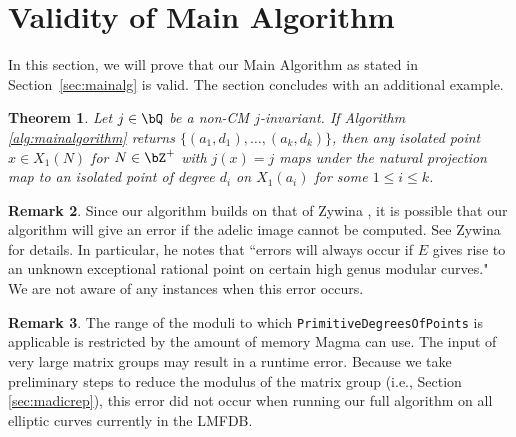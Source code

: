 \documentclass[11pt,reqno]{amsart}
\theoremstyle{plain}
\newtheorem{theorem}{Theorem}%
\theoremstyle{definition}
\newtheorem{remark}[theorem]{Remark}
\newcommand{\Q}{\bQ}
\newcommand{\Z}{\bZ}
\newcommand{\PP}{\mathbf P}
\newcommand{\filip}[1]{{\textcolor{cyan}{Filip: [#1]}}}
\begin{document}




\section{Validity of Main Algorithm}
\label{sec:validity}

In this section, we will prove that our Main Algorithm as stated in Section~\ref{sec:mainalg} is valid. The section concludes with an additional example.


\begin{theorem}\label{thm:validity_main_algorithm}
Let $j\in\Q$ be a non-CM $j$-invariant. If Algorithm \ref{alg:mainalgorithm} returns $\{( a_1,d_1), \dots, ( a_k,d_k) \}$, then any isolated point $x\in X_1(N)$ for $N \in \Z^+$ with $j(x)=j$ maps under the natural projection map to an isolated point of degree $d_i$ on $X_1(a_i)$ for some  $1 \leq i \leq k$.
\end{theorem}

\begin{remark}
Since our algorithm builds on that of Zywina \cite{ZywinaAlgorithm}, it is possible that our algorithm will give an error if the adelic image cannot be computed. See Zywina \cite{ZywinaImagesGit} for details. In particular, he notes that ``errors will always occur if $E$ gives rise to an unknown exceptional rational point on certain high genus modular curves." We are not aware of any instances when this error occurs.
\end{remark}

\begin{remark}
The range of the moduli to which \texttt{PrimitiveDegreesOfPoints} is applicable is restricted by the amount of memory Magma can use. The input of very large matrix groups may result in a runtime error. Because we take preliminary steps to reduce the modulus of the matrix group (i.e., Section \ref{sec:madicrep}), this error did not occur when running our full algorithm on all elliptic curves currently in the LMFDB.
\end{remark}
\end{document}

